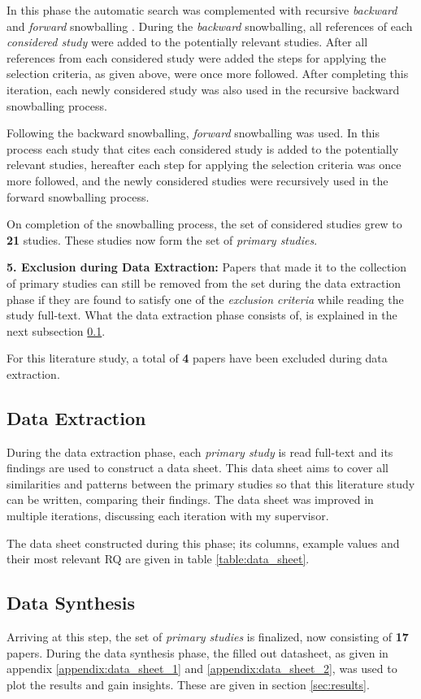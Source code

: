 In this phase the automatic search was complemented with recursive \textit{backward} and \textit{forward} snowballing \cite{wohlin2014snowballing}.
During the \textit{backward} snowballing, all references of each \textit{considered study} were added to the potentially relevant studies. 
After all references from each considered study were added the steps for applying the selection criteria, as given above, were once more followed. 
After completing this iteration, each newly considered study was also used in the recursive backward snowballing process.

Following the backward snowballing, \textit{forward} snowballing was used. 
In this process each study that cites each considered study is added to the potentially relevant studies, 
hereafter each step for applying the selection criteria was once more followed, 
and the newly considered studies were recursively used in the forward snowballing process.

\vspace{5mm}

On completion of the snowballing process, the set of considered studies grew to \textbf{21} studies.
These studies now form the set of \textit{primary studies}.

\vspace{5mm}

\noindent\textbf{5. Exclusion during Data Extraction:}
Papers that made it to the collection of primary studies can still be removed from the set during the data extraction phase if they 
are found to satisfy one of the \textit{exclusion criteria} while reading the study full-text. 
What the data extraction phase consists of, is explained in the next subsection \ref{sec:study_design:data_extract}.

For this literature study, a total of \textbf{4} papers have been excluded during data extraction. 

\subsection{Data Extraction}
\label{sec:study_design:data_extract}
During the data extraction phase, each \textit{primary study} is read full-text and its findings are used to construct a data sheet.
This data sheet aims to cover all similarities and patterns between the primary studies so that this literature study can be written, comparing their findings.
The data sheet was improved in multiple iterations, discussing each iteration with my supervisor.

The data sheet constructed during this phase; its columns, example values and their most relevant RQ are given in table \ref{table:data_sheet}.

\subsection{Data Synthesis}
\label{sec:study_design:data_synth}
Arriving at this step, the set of \textit{primary studies} is finalized, now consisting of \textbf{17} papers.
During the data synthesis phase, the filled out datasheet, as given in appendix \ref{appendix:data_sheet_1} and \ref{appendix:data_sheet_2}, 
was used to plot the results and gain insights.
These are given in section \ref{sec:results}.